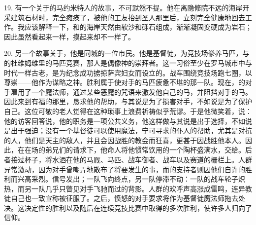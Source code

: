 19. 有一个关于的马约米特人的故事，不可默然不提。他在离隐修院不远的海岸开采建筑石材时，完全瘫痪了，被他的工友抬到圣人那里后，立刻完全健康地回去工作。我应该解释一下，和的海岸天然由软沙和砾石组成，渐渐凝固变硬成为岩石；因此虽然看起来一样，摸起来却不一样了。\par

20. 另一个故事关于，他是同城的一位市民。他是基督徒，为竞技场豢养马匹，与的杜维姆维里的马匹竞赛，那人是偶像神的崇拜者。这一习俗至少在罗马城市中与时代一样古老，是为纪念成功掳掠萨宾妇女而设立的。战车围绕竞技场跑七圈，以尊崇——他作为谋略之神。胜利属于使对手的马匹疲惫不堪的那一队。现在，的对手雇用了一个魔法师，通过某些恶魔的咒语来激发他自己的马，并阻挡对手的马。因此来到有福的那里，恳求他的帮助，与其说是为了损害对手，不如说是为了保护自己。这位可敬的老人觉得在这种琐事上浪费祈祷似乎荒谬。于是他微笑着，说：他的访客回答说，他的职务是一项公共义务，他这样做与其说是出于选择，不如说是出于强迫；没有一个基督徒可以使用魔法，宁可寻求的仆人的帮助，尤其是对抗的人，他们是天主的敌人，并且会因战胜的教会而狂喜，更甚于因战胜他本人。因此，在在场的弟兄们的请求下，他命人将他惯常饮用的一个陶杯盛满水，交给。后者接过杯子，将水洒在他的马厩、马匹、战车御者、战车以及赛道的栅栏上。人群异常激动，因为对手曾嘲弄地散布了将要发生的事，而的支持者则因他们自许的胜利而兴高采烈。信号发出；一队飞向终点，另一队停滞不动：一队的战车轮子炽热，而另一队几乎只瞥见对手飞驰而过的背影。人群的欢呼声高涨成雷鸣，连异教徒自己也一致宣称被征服了。之后，愤怒的对手要求将作为基督徒魔法师拖去处决。这决定性的胜利以及随后在连续竞技比赛中取得的多次胜利，使许多人归向了信仰。\par

